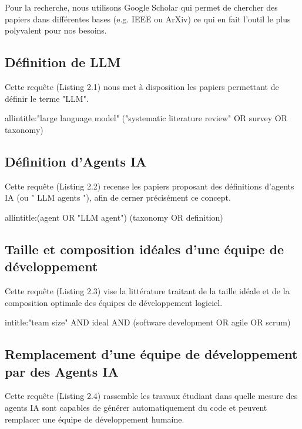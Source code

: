 Pour la recherche, nous utilisons Google Scholar qui permet de chercher des papiers dans différentes bases (e.g. IEEE ou ArXiv) ce qui en fait l'outil le plus polyvalent pour nos besoins.

\subsection{Définition de LLM}

Cette requête (Listing 2.1) nous met à disposition les papiers permettant de définir le terme "LLM".

\begin{codeC}

    allintitle:"large language model" ("systematic literature review" OR survey OR taxonomy)
\end{codeC}

\subsection{Définition d'Agents IA}

Cette requête (Listing 2.2) recense les papiers proposant des définitions d’agents IA (ou " LLM agents "), afin de cerner précisément ce concept.

\begin{codeC}
    allintitle:(agent OR "LLM agent") (taxonomy OR definition)
\end{codeC}

\subsection{Taille et composition idéales d'une équipe de développement}

Cette requête (Listing 2.3) vise la littérature traitant de la taille idéale et de la composition optimale des équipes de développement logiciel.

\begin{codeC}
    intitle:"team size" AND ideal AND (software development OR agile OR scrum)
\end{codeC}

\subsection{Remplacement d'une équipe de développement par des Agents IA}

Cette requête (Listing 2.4) rassemble les travaux étudiant dans quelle mesure des agents IA sont capables de générer automatiquement du code et peuvent remplacer une équipe de développement humaine.

